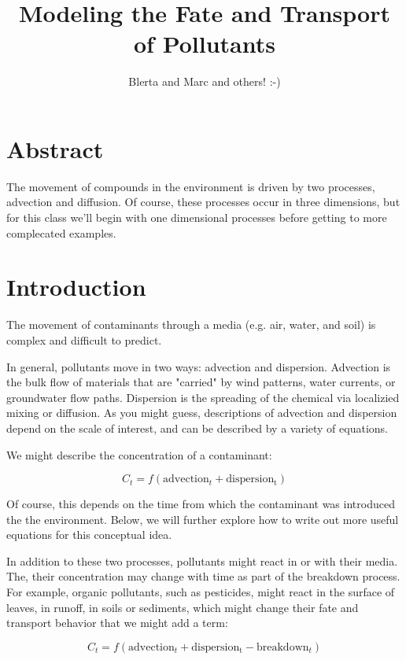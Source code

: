 \documentclass{article}
\author{Blerta and Marc and others! :-)}
\title{Modeling the Fate and Transport of Pollutants}
\begin{document}

\maketitle

\section{Abstract}
\noindent The movement of compounds in the environment is driven by two processes, advection and diffusion. Of course, these processes occur in three dimensions, but for this class we'll begin with one dimensional processes before getting to more complecated examples.

\section{Introduction}

The movement of contaminants through a media (e.g. air, water, and soil) is complex and difficult to predict. 

In general, pollutants move in two ways: advection and dispersion. Advection is the bulk flow of materials that are "carried" by wind patterns, water currents, or groundwater flow paths. Dispersion is the spreading of the chemical via localizied mixing or diffusion. As you might guess, descriptions of advection and dispersion depend on the scale of interest, and can be described by a variety of equations.

We might describe the concentration of a contaminant:

\begin{equation}
C_t = f(\mathrm{advection}_t + \mathrm{dispersion_t})
\end{equation}

Of course, this depends on the time from which the contaminant was introduced the the environment. Below, we will further explore how to write out more useful equations for this conceptual idea.

In addition to these two processes, pollutants might react in or with their media. The, their concentration may change with time as part of the breakdown process. For example, organic pollutants, such as pesticides, might react in the surface of leaves, in runoff, in soils or sediments, which might change their fate and transport behavior that we might add a term: 

\begin{equation}
C_t = f(\mathrm{advection}_t + \mathrm{dispersion_t} - \mathrm{breakdown}_t)
\end{equation}
\end{document}
